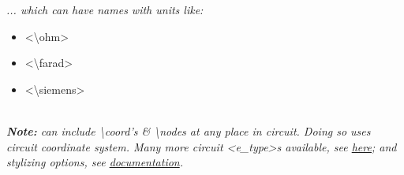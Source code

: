 \textit{... which can have names with units like:} \\
\begin{itemize}
    \item <\textbackslash ohm>
    \item <\textbackslash farad>
    \item <\textbackslash siemens>
\end{itemize}\ \\

\textit{\textbf{Note:} can include \textbackslash coord's \& \textbackslash nodes at any place in circuit.  Doing so uses circuit coordinate system.  Many more circuit <e\_type>s available, see \href{https://www.overleaf.com/learn/latex/CircuiTikz_package}{here}; and stylizing options, see \href{http://mirrors.ctan.org/graphics/pgf/contrib/circuitikz/doc/circuitikzmanual.pdf}{documentation}.}

\ \\